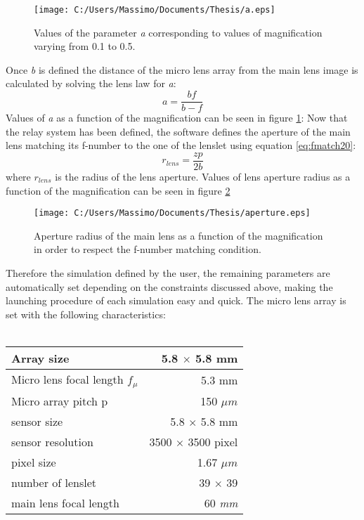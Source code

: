 \begin{figure}[H]
	\centering
	\texttt{[image: C:/Users/Massimo/Documents/Thesis/a.eps]}
	\caption{\label{fig:a} Values of the parameter \textit{a} corresponding to values of magnification varying from 0.1 to 0.5.}
\end{figure}
Once \textit{b} is defined the distance of the micro lens array from the main lens image is calculated by solving the lens law for \textit{a}:
\begin{equation}
	\label{eq:a}
a = \dfrac{bf}{b-f}
\end{equation} 
Values of \textit{a} as a function of the magnification can be seen in figure \ref{fig:a}:
Now that the relay system has been defined, the software defines the aperture of the main lens matching its f-number to the one of the lenslet using equation \ref{eq:fmatch20}:
\begin{equation}
	\label{eq:radiuslens}
r_{lens} = \dfrac{zp}{2b}
\end{equation}
where $r_{lens}$ is the radius of the lens aperture.
Values of lens aperture radius as a function of the magnification can be seen in figure \ref{fig:aperture1}
\begin{figure}[H]
	\centering
	\texttt{[image: C:/Users/Massimo/Documents/Thesis/aperture.eps]}
	\caption{\label{fig:aperture1} Aperture radius of the main lens as a function of the magnification in order to respect the f-number matching condition.}
\end{figure}
Therefore the simulation defined by the user, the remaining parameters are automatically set depending on the constraints discussed above, making the launching procedure of each simulation easy and quick.
The micro lens array is set with the following characteristics:\\
\\
\begin{center}
	\begin{tabular}{l|r}
	
		\centering
		Array size & 5.8 $\times$  5.8 mm\\ \hline
		Micro lens focal length $f_{\mu}$ & 5.3 mm \\ \hline
		Micro array pitch p & 150 $\mu m$ \\ \hline
		sensor size & 5.8 $\times$  5.8 mm\\ \hline
		sensor resolution & 3500 $\times$  3500 pixel \\ \hline
		pixel size & 1.67 $\mu m$ \\ \hline
		number of lenslet & 39 $\times$ 39  \\ \hline
		main lens focal length & 60 \textit{mm}
		\label{tab:4}
	\end{tabular}
\end{center}
